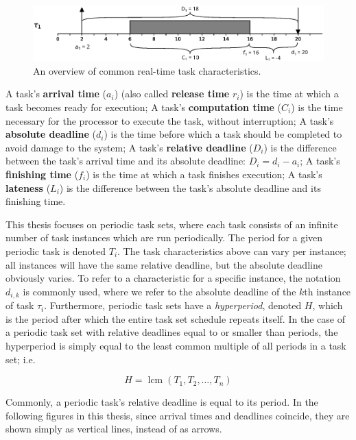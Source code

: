 \documentclass[twoside]{uva-inf-bachelor-thesis}
\DeclareMathOperator{\lcm}{lcm}
\begin{document}
\begin{figure}[htpb]
    \centering
    \includegraphics[width=\textwidth]{taskcharacteristics.eps}
    \caption{An overview of common real-time task characteristics.}
    \label{fig:taskcharacteristics}
\end{figure}

\begin{outline}
    \1 A task's \textbf{arrival time} ($a_i$) (also called \textbf{release time} $r_i$) is the time at which a task becomes ready for execution;
    \1 A task's \textbf{computation time} ($C_i$) is the time necessary for the processor to execute the task, without interruption;
    \1 A task's \textbf{absolute deadline} ($d_i$) is the time before which a task should be completed to avoid damage to the system;
    \1 A task's \textbf{relative deadline} ($D_i$) is the difference between the task's arrival time and its absolute deadline: $D_i = d_i - a_i$;
    \1 A task's \textbf{finishing time} ($f_i$) is the time at which a task finishes execution;
    \1 A task's \textbf{lateness} ($L_i$) is the difference between the task's absolute deadline and its finishing time.
\end{outline}

\noindent This thesis focuses on periodic task sets, where each task consists of an infinite number of task instances which are run periodically. The period for a given periodic task is denoted $T_i$. The task characteristics above can vary per instance; all instances will have the same relative deadline, but the absolute deadline obviously varies. To refer to a characteristic for a specific instance, the notation $d_{i,k}$ is commonly used, where we refer to the absolute deadline of the $k$th instance of task $\tau_i$. Furthermore, periodic task sets have a \emph{hyperperiod}, denoted $H$, which is the period after which the entire task set schedule repeats itself. In the case of a periodic task set with relative deadlines equal to or smaller than periods, the hyperperiod is simply equal to the least common multiple of all periods in a task set; i.e.

\[ H = \lcm(T_1, T_2, \ldots, T_n) \] 

Commonly, a periodic task's relative deadline is equal to its period. In the following figures in this thesis, since arrival times and deadlines coincide, they are shown simply as vertical lines, instead of as arrows.
\end{document}
